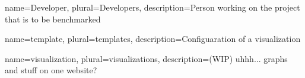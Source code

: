 \makenoidxglossaries

{
	name=Developer,
	plural=Developers,
	description={Person working on the project that is to be benchmarked}
}

{
	name=template,
	plural=templates,
	description={Configuaration of a \Gls{visualization}}
}

{
	name=visualization,
	plural=visualizations,
	description={(WIP) uhhh... graphs and stuff on one website?}
}

